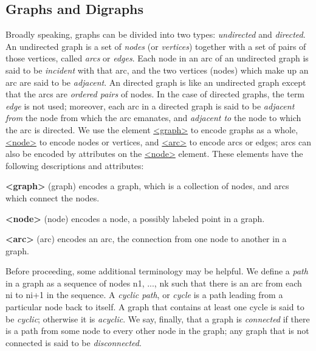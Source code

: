 \subsection[{Graphs and Digraphs}]{Graphs and Digraphs}\label{GDGR}\par
Broadly speaking, graphs can be divided into two types: \textit{undirected} and \textit{directed}. An undirected graph is a set of \textit{nodes} (or \textit{vertices}) together with a set of pairs of those vertices, called \textit{arcs} or \textit{edges}. Each node in an arc of an undirected graph is said to be \textit{incident} with that arc, and the two vertices (nodes) which make up an arc are said to be \textit{adjacent}. An directed graph is like an undirected graph except that the arcs are \textit{ordered pairs} of nodes. In the case of directed graphs, the term \textit{edge} is not used; moreover, each arc in a directed graph is said to be \textit{adjacent from} the node from which the arc emanates, and \textit{adjacent to} the node to which the arc is directed. We use the element \hyperref[TEI.graph]{<graph>} to encode graphs as a whole, \hyperref[TEI.node]{<node>} to encode nodes or vertices, and \hyperref[TEI.arc]{<arc>} to encode arcs or edges; arcs can also be encoded by attributes on the \hyperref[TEI.node]{<node>} element. These elements have the following descriptions and attributes: 
\begin{sansreflist}
  
\item [\textbf{<graph>}] (graph) encodes a graph, which is a collection of nodes, and arcs which connect the nodes.
\item [\textbf{<node>}] (node) encodes a node, a possibly labeled point in a graph.
\item [\textbf{<arc>}] (arc) encodes an arc, the connection from one node to another in a graph.
\end{sansreflist}
\par
Before proceeding, some additional terminology may be helpful. We define a \textit{path} in a graph as a sequence of nodes n1, ..., nk such that there is an arc from each ni to ni+1 in the sequence. A \textit{cyclic path}, or \textit{cycle} is a path leading from a particular node back to itself. A graph that contains at least one cycle is said to be \textit{cyclic}; otherwise it is \textit{acyclic}. We say, finally, that a graph is \textit{connected} if there is a path from some node to every other node in the graph; any graph that is not connected is said to be \textit{disconnected}.\par
